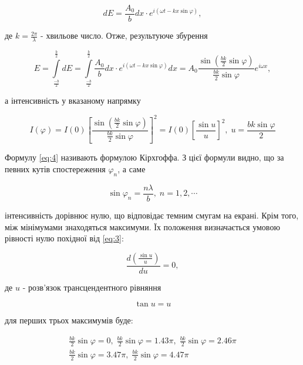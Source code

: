 \begin{equation} \label{eq:2}
    dE = \frac{A_0}{b}dx \cdot e^{i(\omega t - kx \sin{\varphi})},
\end{equation}

де $k = \frac{2 \pi}{\lambda}$ - хвильове число. Отже, результуюче збурення

\begin{equation} \label{eq:3}
    E = \int\limits_{\frac{-b}{2}}^{\frac{b}{2}} dE = 
    \int\limits_{\frac{-b}{2}}^{\frac{b}{2}} \frac{A_0}{b}dx \cdot e^{i(\omega t - kx \sin{\varphi})} dx = 
    A_0 \frac{\sin{( \frac{bk}{2} \sin{\varphi} )}}{ \frac{bk}{2} \sin{\varphi} } e^{i \omega x},
\end{equation}

а інтенсивність у вказаному напрямку

\begin{equation} \label{eq:4}
    I(\varphi) = I(0) \left[ \frac{\sin{( \frac{bk}{2} \sin{\varphi} )}}{ \frac{bk}{2} \sin{\varphi} } \right]^2 = 
    I(0) \left[ \frac{\sin{u}}{u} \right]^2, \; u = \frac{bk \sin{\varphi}}{2}
\end{equation}

Формулу \ref{eq:4} називають формулою Кірхгоффа. З цієї формули видно,
що за певних кутів спостереження $\varphi_n$, а саме

\begin{equation} \label{eq:5}
    \sin{\varphi_n} = \frac{n \lambda}{b}, \; n = 1,2, \cdots
\end{equation}

інтенсивність дорівнює нулю, що відповідає темним смугам на екрані.
Крім того, між мінімумами знаходяться максимуми. Їх положення
визначається умовою рівності нулю похідної від \ref{eq:3}:

\begin{equation} \label{eq:6}
    \frac{d \left( \frac{\sin{u}}{u} \right) }{du} = 0,
\end{equation}

де $u$ - розв'язок трансцендентного рівняння

\begin{equation} \label{eq:7}
    \tan{u} = u 
\end{equation}

для перших трьох максимумів буде:

\begin{equation}  \label{eq:7A}
    \begin{gathered}
        \frac{bk}{2}\sin{\varphi} = 0, \;
        \frac{bk}{2}\sin{\varphi} = 1.43 \pi, \;
        \frac{bk}{2}\sin{\varphi} = 2.46 \pi \\
        \frac{bk}{2}\sin{\varphi} = 3.47 \pi, \;
        \frac{bk}{2}\sin{\varphi} = 4.47 \pi
    \end{gathered}    
    \tag{7A}
\end{equation}

